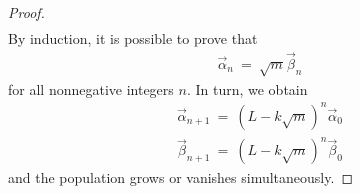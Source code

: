 \documentclass{article}
\numberwithin{equation}{section}
\begin{document}
\begin{proof}
\begin{eqnarray}
    \end{eqnarray} 
    By induction, it is possible to prove that 
    \begin{eqnarray}
        \vec \alpha_n \ = \ \sqrt m \vec \beta_n
    \end{eqnarray}
    for all nonnegative integers $n$. In turn, we obtain 
    \begin{eqnarray}
        \vec \alpha_{n + 1} \ = \ 
        \left(
            L - k \sqrt m
        \right)^n \vec \alpha_0 \nonumber
        \\ 
        \vec \beta_{n + 1} \ = \ 
        \left(
            L - k \sqrt m
        \right)^n \vec \beta_0
    \end{eqnarray}
    and the population grows or vanishes simultaneously. 
\end{proof}

\printbibliography
\end{document}
